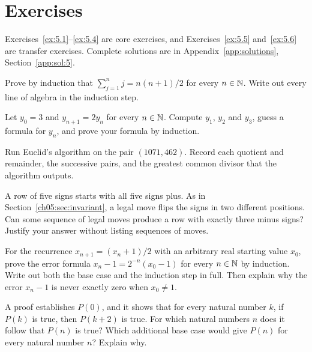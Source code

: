 \section*{Exercises}
Exercises~\ref{ex:5.1}--\ref{ex:5.4} are core exercises, and Exercises~\ref{ex:5.5} and~\ref{ex:5.6} are transfer exercises. Complete solutions are in Appendix~\ref{app:solutions}, Section~\ref{app:sol:5}.
\begin{exercise}\label{ex:5.1}Prove by induction that $\sum_{j=1}^{n}j=n(n+1)/2$ for every $n\in\mathbb N$. Write out every line of algebra in the induction step.\end{exercise}
\begin{exercise}\label{ex:5.2}Let $y_0=3$ and $y_{n+1}=2y_n$ for every $n\in\mathbb N$. Compute $y_1$, $y_2$ and $y_3$, guess a formula for $y_n$, and prove your formula by induction.\end{exercise}
\begin{exercise}\label{ex:5.3}Run Euclid's algorithm on the pair $(1071,462)$. Record each quotient and remainder, the successive pairs, and the greatest common divisor that the algorithm outputs.\end{exercise}
\begin{exercise}\label{ex:5.4}A row of five signs starts with all five signs plus. As in Section~\ref{ch05:sec:invariant}, a legal move flips the signs in two different positions. Can some sequence of legal moves produce a row with exactly three minus signs? Justify your answer without listing sequences of moves.\end{exercise}
\begin{exercise}\label{ex:5.5}For the recurrence $x_{n+1}=(x_n+1)/2$ with an arbitrary real starting value $x_0$, prove the error formula $x_n-1=2^{-n}(x_0-1)$ for every $n\in\mathbb N$ by induction. Write out both the base case and the induction step in full. Then explain why the error $x_n-1$ is never exactly zero when $x_0\ne1$.\end{exercise}
\begin{exercise}\label{ex:5.6}A proof establishes $P(0)$, and it shows that for every natural number $k$, if $P(k)$ is true, then $P(k+2)$ is true. For which natural numbers $n$ does it follow that $P(n)$ is true? Which additional base case would give $P(n)$ for every natural number $n$? Explain why.\end{exercise}
